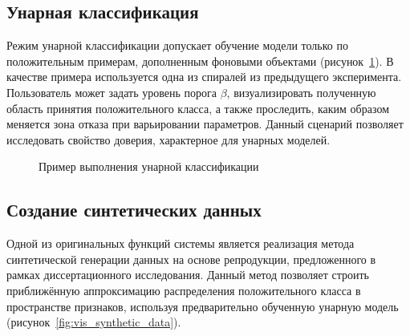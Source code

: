 \subsection{Унарная классификация}
Режим унарной классификации допускает обучение модели только по положительным примерам, дополненным фоновыми объектами (рисунок~\cref{fig:vis_unary_classification}). В качестве примера используется одна из спиралей из предыдущего эксперимента. Пользователь может задать уровень порога \(\beta\), визуализировать полученную область принятия положительного класса, а также проследить, каким образом меняется зона отказа при варьировании параметров. Данный сценарий позволяет исследовать свойство доверия, характерное для унарных моделей.

\begin{figure}[ht]
    \caption{Пример выполнения унарной классификации}
    \label{fig:vis_unary_classification}
\end{figure}

\subsection{Создание синтетических данных}
Одной из оригинальных функций системы является реализация метода синтетической генерации данных на основе репродукции, предложенного в рамках диссертационного исследования. Данный метод позволяет строить приближённую аппроксимацию распределения положительного класса в пространстве признаков, используя предварительно обученную унарную модель (рисунок~\cref{fig:vis_synthetic_data}).

